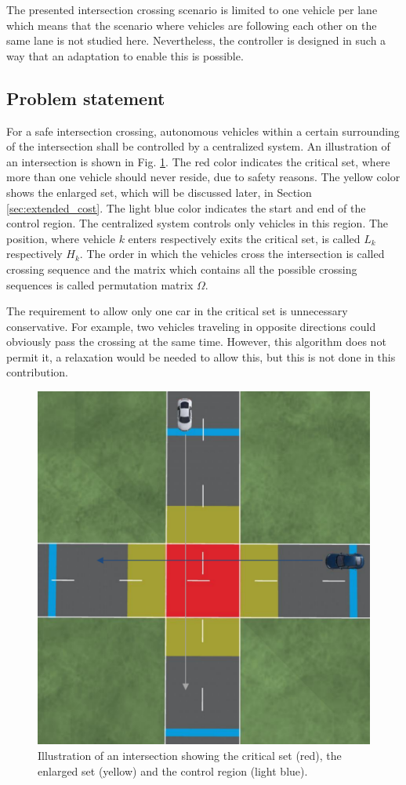 \documentclass[letterpaper,10pt,conference]{ieeeconf}
\begin{document}
The presented intersection crossing scenario is limited to one vehicle per lane which means that the scenario where vehicles are following each other on the same lane is not studied here. Nevertheless, the controller is designed in such a way that an adaptation to enable this is possible.

\subsection{Problem statement}
For a safe intersection crossing, autonomous vehicles within a certain surrounding of the intersection shall be controlled by a centralized system.
An illustration of an intersection is shown in Fig. \ref{fig:ProbState}. The red color indicates the critical set, where more than one vehicle should never reside, due to safety reasons. The yellow color shows the enlarged set, which will be discussed later, in Section \ref{sec:extended_cost}. The light blue color indicates the start and end of the control region. The centralized system controls only vehicles in this region. The position, where vehicle $k$ enters respectively exits the critical set, is called $L_k$ respectively $H_k$. The order in which the vehicles cross the intersection is called crossing sequence and the matrix which contains all the possible crossing sequences is called permutation matrix  $\Omega$.

The requirement to allow only one car in the critical set is
unnecessary conservative. For example, two vehicles traveling in
opposite directions could obviously pass the crossing at the same time. However, this
algorithm does not permit it, a relaxation would be needed to allow
this, but this is not done in this contribution.

\begin{figure}
    \centering
    \includegraphics[width=0.9\columnwidth]{czone.pdf}
    \caption{Illustration of an intersection showing the critical set (red), the enlarged set (yellow) and the control region (light blue).}
    \label{fig:ProbState}
\end{figure}
\end{document}
